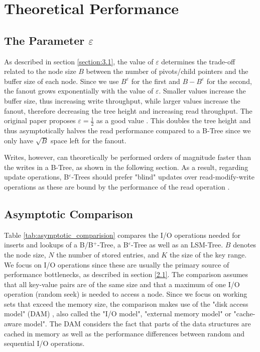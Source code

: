 
\chapter{Theoretical Performance}\label{chapter:theoretical_performance}

\section{The Parameter $\varepsilon$}

As described in section \ref{section:3.1}, the value of $\varepsilon$ determines the trade-off related to the node size $B$ between the number of pivots/child pointers and the buffer size of each node. Since we use $B^\varepsilon$ for the first and $B-B^\varepsilon$ for the second, the fanout grows exponentially with the value of $\varepsilon$. Smaller values increase the buffer size, thus increasing write throughput, while larger values increase the fanout, therefore decreasing the tree height and increasing read throughput. The original paper proposes $\varepsilon=\frac{1}{2}$ as a good value \cite{b_epsilon_tree}. This doubles the tree height and thus asymptotically halves the read performance compared to a B-Tree since we only have $\sqrt{B}$ space left for the fanout.

Writes, however, can theoretically be performed orders of magnitude faster than the writes in a B-Tree, as shown in the following section. As a result, regarding update operations, B$^\varepsilon$-Trees should prefer "blind" updates over read-modify-write operations as these are bound by the performance of the read operation \cite{b_epsilon_tree}.

\section{Asymptotic Comparison}

Table \ref{tab:asymptotic_comparision} compares the I/O operations needed for inserts and lookups of a B/B$^+$-Tree, a B$^\varepsilon$-Tree as well as an LSM-Tree. $B$ denotes the node size, $N$ the number of stored entries, and $K$ the size of the key range. We focus on I/O operations since these are usually the primary source of performance bottlenecks, as described in section \ref{2.1}. The comparison assumes that all key-value pairs are of the same size and that a maximum of one I/O operation (random seek) is needed to access a node.\newline
Since we focus on working sets that exceed the memory size, the comparison makes use of the "disk access model" (DAM) \cite{dam,cache-oblivious}, also called the "I/O model", "external memory model" or "cache-aware model". The DAM considers the fact that parts of the data structures are cached in memory as well as the performance differences between random and sequential I/O operations.

